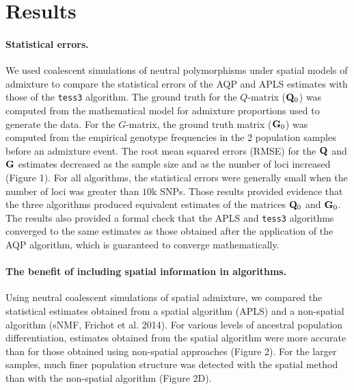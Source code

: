 \clearpage
\newpage


\section{Results}



\paragraph{Statistical errors.}  We used  coalescent simulations of neutral polymorphisms under spatial models of admixture to compare the statistical errors of the AQP and APLS estimates with those of the {\tt tess3} algorithm. The ground truth for the $Q$-matrix (${\bf Q}_0$)  was computed from the mathematical model for admixture proportions used to generate the data. For the $G$-matrix, the  ground truth matrix (${\bf G}_0$) was computed from the empirical genotype frequencies in the 2 population samples before an admixture event.  The root mean squared errors (RMSE) for the ${\bf Q}$ and ${\bf G}$ estimates decreased as the sample size and as the number of loci increased (Figure 1). For all algorithms, the statistical errors were generally small when the number of loci was greater than $10$k SNPs. Those results provided evidence that the three algorithms produced equivalent estimates of the matrices ${\bf Q}_0$ and ${\bf G}_0$. The results also provided a formal check that the APLS and {\tt tess3} algorithms converged to the same estimates as those obtained after the application of  the AQP algorithm, which is guaranteed to converge mathematically.   


\paragraph{The benefit of including spatial information in algorithms.}    Using  neutral coalescent simulations of spatial admixture, we compared the statistical estimates obtained from a spatial algorithm (APLS) and a non-spatial algorithm (sNMF, Frichot et al. 2014).  For various levels of ancestral population differentiation, estimates obtained from the spatial algorithm were more accurate than for those obtained using non-spatial approaches (Figure 2). For the larger samples, much finer population structure was detected with the spatial method than with the non-spatial algorithm (Figure 2D). 

